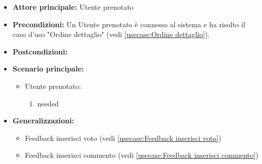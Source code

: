 \label{usecase:Feedback inserisci}
\begin{itemize}
\item \textbf{Attore principale:} Utente prenotato
\item \textbf{Precondizioni:}
Un Utente prenotato è connesso al sistema e ha risolto il caso d'uso "Ordine dettaglio" (vedi \autoref{usecase:Ordine dettaglio}).
\item \textbf{Postcondizioni:}
\item \textbf{Scenario principale:}
\begin{itemize}
\item Utente prenotato:
\begin{enumerate}
\item needed
\end{enumerate}
\end{itemize}
\item \textbf{Generalizzazioni:}
\begin{itemize}
\item Feedback inserisci voto (vedi \autoref{usecase:Feedback inserisci voto})\item Feedback inserisci commento (vedi \autoref{usecase:Feedback inserisci commento})
\end{itemize}
\end{itemize}